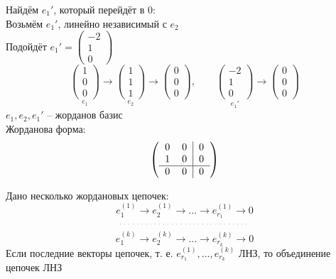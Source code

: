 \begin{eg}
\begin{itemize}
	Найдём $ e_1' $, который перейдёт в 0: \\
	Возьмём $ e_1' $, линейно независимый с $ e_2 $ \\
	Подойдёт $ e_1' =
	\begin{pmatrix}
		-2 \\
		1 \\
		0
	\end{pmatrix} $
	$$ \underset{e_1}{
		\begin{pmatrix}
			1 \\
			0 \\
			0
		\end{pmatrix}} \to \underset{e_2}{
		\begin{pmatrix}
			1 \\
			1 \\
			1
		\end{pmatrix}} \to
	\begin{pmatrix}
		0 \\
		0 \\
		0
	\end{pmatrix}, \qquad \underset{e_1'}{
		\begin{pmatrix}
			-2 \\
			1 \\
			0
		\end{pmatrix}} \to
	\begin{pmatrix}
		0 \\
		0 \\
		0
	\end{pmatrix} $$
	$ e_1, e_2, e_1' $ -- жорданов базис \\
	Жорданова форма:
	$$ \left(
	\begin{tabular}{c c | c}
		0 & 0 & 0 \\
		1 & 0 & 0 \\
		\hline
		0 & 0 & 0
	\end{tabular} \right) $$
	\end{itemize}
\end{eg}

\begin{lemma}
	Дано несколько жордановых цепочек:
	$$ e_1^{(1)} \to e_2^{(1)} \to ... \to e_{r_1}^{(1)} \to 0 $$
	$$ \widedots $$
	$$ e_1^{(k)} \to e_2^{(k)} \to ... \to e_{r_k}^{(k)} \to 0 $$
	Если последние векторы цепочек, т. е. $ e_{r_1}^{(1)}, ..., e_{r_k}^{(k)} $ ЛНЗ, то объединение цепочек ЛНЗ
\end{lemma}

